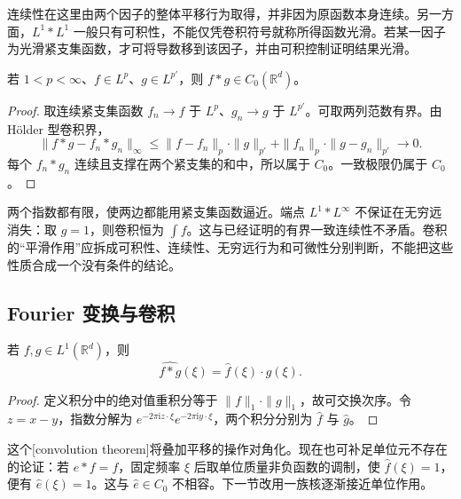 连续性在这里由两个因子的整体平移行为取得，并非因为原函数本身连续。另一方面，\(L^1*L^1\) 一般只有可积性，不能仅凭卷积符号就称所得函数光滑。若某一因子为光滑紧支集函数，才可将导数移到该因子，并由可积控制证明结果光滑。


\begin{corollary}\label{b2:cor:03-convolution-c0}
若 \(1<p<\infty\)、\(f\in L^p\)、\(g\in L^{p'}\)，则 \(f*g\in C_0(\mathbb R^d)\)。
\end{corollary}
\begin{proof}
取连续紧支集函数 \(f_n\to f\) 于 \(L^p\)、\(g_n\to g\) 于 \(L^{p'}\)。可取两列范数有界。由 Hölder 型卷积界，
\[
 \|f*g-f_n*g_n\|_\infty
 \leq\|f-f_n\|_p\cdot\|g\|_{p'}
 +\|f_n\|_p\cdot\|g-g_n\|_{p'}\longrightarrow0.
\]
每个 \(f_n*g_n\) 连续且支撑在两个紧支集的和中，所以属于 \(C_0\)。一致极限仍属于 \(C_0\)。
\end{proof}

两个指数都有限，使两边都能用紧支集函数逼近。端点 \(L^1*L^\infty\) 不保证在无穷远消失：取 \(g=1\)，则卷积恒为 \(\int f\)。这与已经证明的有界一致连续性不矛盾。卷积的“平滑作用”应拆成可积性、连续性、无穷远行为和可微性分别判断，不能把这些性质合成一个没有条件的结论。

\subsection{Fourier 变换与卷积}
\label{b2:subsec:030304}

\begin{theorem}[卷积定理]\label{b2:thm:03-convolution-transform}
若 \(f,g\in L^1(\mathbb R^d)\)，则
\[
 \widehat{f*g}(\xi)=\widehat f(\xi)\cdot\widehat g(\xi).
\]
\end{theorem}
\begin{proof}
定义积分中的绝对值重积分等于 \(\|f\|_1\cdot\|g\|_1\)，故可交换次序。令 \(z=x-y\)，指数分解为 \(e^{-2\pi\mathrm{i}z\cdot\xi}e^{-2\pi\mathrm{i}y\cdot\xi}\)，两个积分分别为 \(\widehat f\) 与 \(\widehat g\)。
\end{proof}

这个[convolution theorem]将叠加平移的操作对角化。现在也可补足单位元不存在的论证：若 \(e*f=f\)，固定频率 \(\xi\) 后取单位质量非负函数的调制，使 \(\widehat f(\xi)=1\)，便有 \(\widehat e(\xi)=1\)。这与 \(\widehat e\in C_0\) 不相容。下一节改用一族核逐渐接近单位作用。
